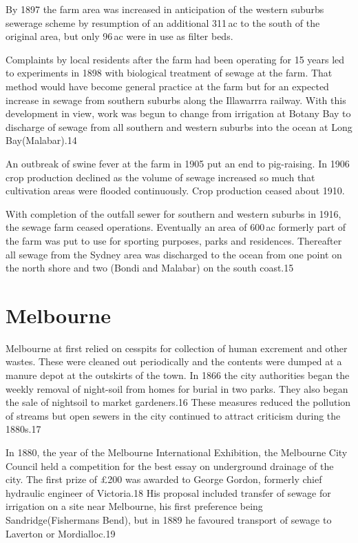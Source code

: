 By 1897 the farm area was increased in anticipation of the western
suburbs sewerage scheme by resumption of an additional 311\,ac to the
south of the original area, but only 96\,ac were in use as filter
beds.

Complaints by local residents after the farm had been operating for 15
years led to experiments in 1898 with biological treatment of sewage
at the farm.  That method would have become general practice at the
farm but for an expected increase in sewage from southern suburbs
along the Illawarrra railway.  With this development in view, work was
begun to change from irrigation at Botany Bay to discharge of sewage
from all southern and western suburbs into the ocean at Long
Bay(Malabar).14

An outbreak of swine fever at the farm in 1905 put an end to
pig-raising.  In 1906 crop production declined as the volume of sewage
increased so much that cultivation areas were flooded continuously.
Crop production ceased about 1910.

With completion of the outfall sewer for southern and western suburbs
in 1916, the sewage farm ceased operations.  Eventually an area of
600\,ac formerly part of the farm was put to use for sporting
purposes, parks and residences.  Thereafter all sewage from the Sydney
area was discharged to the ocean from one point on the north shore and
two (Bondi and Malabar) on the south coast.15

\section{Melbourne}

Melbourne at first relied on cesspits for collection of human
excrement and other wastes.  These were cleaned out periodically and
the contents were dumped at a manure depot at the outskirts of the
town.  In 1866 the city authorities began the weekly removal of
night-soil from homes for burial in two parks.  They also began the
sale of nightsoil to market gardeners.16 These measures reduced the
pollution of streams but open sewers in the city continued to attract
criticism during the 1880s.17

In 1880, the year of the Melbourne International Exhibition, the
Melbourne City Council held a competition for the best essay on
underground drainage of the city.  The first prize of \pounds200 was
awarded to George Gordon, formerly chief hydraulic engineer of
Victoria.18 His proposal included transfer of sewage for irrigation on
a site near Melbourne, his first preference being Sandridge(Fishermans
Bend), but in 1889 he favoured transport of sewage to Laverton or
Mordialloc.19

